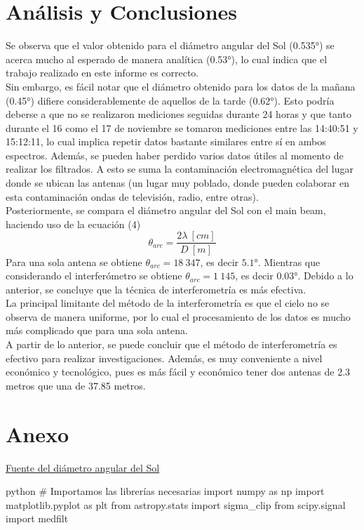 \section{Análisis y Conclusiones}
Se observa que el valor obtenido para el diámetro angular del Sol (0.535°) se acerca mucho al esperado de manera analítica (0.53°), lo cual indica que el trabajo realizado en este informe es correcto.\\
\indent Sin embargo, es fácil notar que el diámetro obtenido para los datos de la mañana (0.45°) difiere considerablemente de aquellos de la tarde (0.62°). Esto podría deberse a que no se realizaron mediciones seguidas durante 24 horas y que tanto durante el 16 como el 17 de noviembre se tomaron mediciones entre las 14:40:51 y 15:12:11, lo cual implica repetir datos bastante similares entre sí en ambos espectros. Además, se pueden haber perdido varios datos útiles al momento de realizar los filtrados. A esto se suma la contaminación electromagnética del lugar donde se ubican las antenas (un lugar muy poblado, donde pueden colaborar en esta contaminación ondas de televisión, radio, entre otras).\\
\indent Posteriormente, se compara el diámetro angular del Sol con el main beam, haciendo uso de la ecuación (4)
\begin{equation}
    \theta_{arc}=\frac{2\lambda\ [cm]}{D\ [m]}
\end{equation}
\indent Para una sola antena se obtiene $\theta_{arc}=18\ 347$, es decir $5.1°$. Mientras que considerando el interferómetro se obtiene $\theta_{arc}=1\ 145$, es decir $0.03°$. Debido a lo anterior, se concluye que la técnica de interferometría es más efectiva.\\
La principal limitante del método de la interferometría es que el cielo no se observa de manera uniforme, por lo cual el procesamiento de los datos es mucho más complicado que para una sola antena.\\
\indent A partir de lo anterior, se puede concluir que el método de interferometría es efectivo para realizar investigaciones. Además, es muy conveniente a nivel económico y tecnológico, pues es más fácil y económico tener dos antenas de 2.3 metros que una de 37.85 metros.
\newpage

\section{Anexo}
\href{https://www.matem.unam.mx/~barot/clases/2012-2/24medicion.pdf}{Fuente del diámetro angular del Sol}
\begin{sourcecode}[\label{codigo-python}]{python}
# Importamos las librerías necesarias
import numpy as np
import matplotlib.pyplot as plt
from astropy.stats import sigma_clip
from scipy.signal import medfilt
\end{sourcecode}


